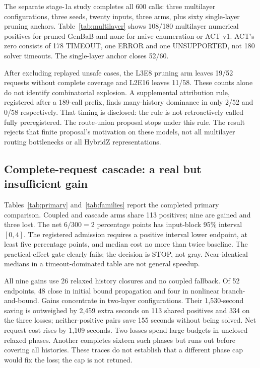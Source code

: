 \documentclass[11pt]{article}
\begin{document}
The separate stage-1a study completes all 600 calls: three multilayer
configurations, three seeds, twenty inputs, three arms, plus sixty
single-layer pruning anchors. Table~\ref{tab:multilayer} shows 108/180
multilayer numerical positives for pruned GenBaB and none for naive enumeration
or ACT v1. ACT's zero consists of 178 TIMEOUT, one ERROR and one UNSUPPORTED,
not 180 solver timeouts. The single-layer anchor closes 52/60.

After excluding replayed unsafe cases, the L3E8 pruning arm leaves 19/52
requests without complete coverage and L2E16 leaves 11/58. These counts alone
do not identify combinatorial explosion. A supplemental attribution rule,
registered after a 189-call prefix, finds many-history dominance in only 2/52
and 0/58 respectively. That timing is disclosed: the rule is not retroactively
called fully preregistered. The route-union proposal stops under this rule.
The result rejects that finite proposal's motivation on these models, not all
multilayer routing bottlenecks or all HybridZ representations.

\subsection{Complete-request cascade: a real but insufficient gain}
Tables~\ref{tab:primary} and~\ref{tab:families} report the completed primary
comparison. Coupled and cascade arms share 113 positives; nine are gained and
three lost. The net $6/300=2$ percentage points has input-block 95\% interval
$[0,4]$. The registered admission requires a positive interval lower endpoint,
at least five percentage points, and median cost no more than twice baseline.
The practical-effect gate clearly fails; the decision is STOP, not gray.
Near-identical medians in a timeout-dominated table are not general speedup.

All nine gains use 26 relaxed history closures and no coupled fallback. Of
52 endpoints, 48 close in initial bound propagation and four in nonlinear
branch-and-bound. Gains concentrate in two-layer configurations. Their
1,530-second saving is outweighed by 2,459 extra seconds on 113 shared positives
and 334 on the three losses; neither-positive pairs save 155 seconds without
being solved. Net request cost rises by 1,109 seconds. Two losses spend large
budgets in unclosed relaxed phases. Another completes sixteen such phases but
runs out before covering all histories. These traces do not establish that a
different phase cap would fix the loss; the cap is not retuned.
\end{document}
